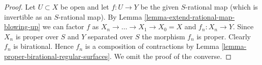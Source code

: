 \begin{proof}
Let $U \subset X$ be open and let $f : U \to Y$ be the given
$S$-rational map (which is invertible as an $S$-rational map).
By Lemma \ref{lemma-extend-rational-map-blowing-up}
we can factor $f$ as $X_n \to \ldots \to X_1 \to X_0 = X$
and $f_n : X_n \to Y$. Since $X_n$ is proper over $S$ and
$Y$ separated over $S$ the morphism $f_n$ is proper.
Clearly $f_n$ is birational. Hence $f_n$ is a composition
of contractions by Lemma \ref{lemma-proper-birational-regular-surfaces}.
We omit the proof of the converse.
\end{proof}












